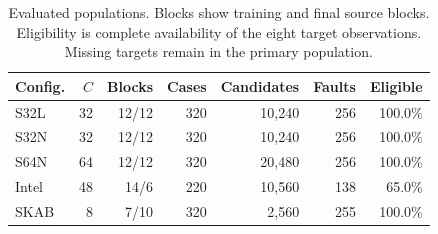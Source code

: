 \begin{table}[t]
\centering
\caption{Evaluated populations. Blocks show training and final source blocks. Eligibility is complete availability of the eight target observations. Missing targets remain in the primary population.}
\label{tab:data}
\small
\begin{tabular}{lrrrrrr}
\toprule
Config. & $C$ & Blocks & Cases & Candidates & Faults & Eligible \\
\midrule
S32L & 32 & 12/12 & 320 & 10,240 & 256 & 100.0\% \\
S32N & 32 & 12/12 & 320 & 10,240 & 256 & 100.0\% \\
S64N & 64 & 12/12 & 320 & 20,480 & 256 & 100.0\% \\
Intel & 48 & 14/6 & 220 & 10,560 & 138 & 65.0\% \\
SKAB & 8 & 7/10 & 320 & 2,560 & 255 & 100.0\% \\
\bottomrule
\end{tabular}
\end{table}
